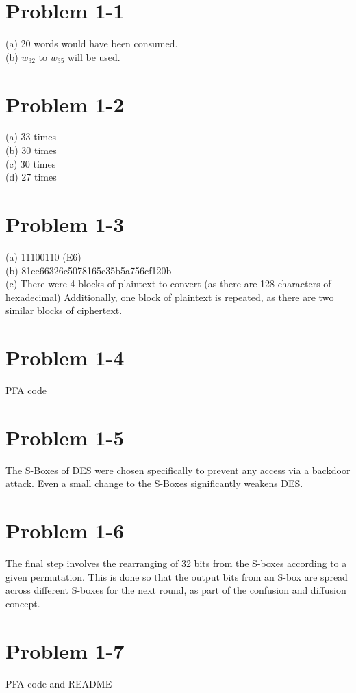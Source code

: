 \documentclass{302}
\author{Divij Singh}
\begin{document}
\section*{Problem 1-1}
(a) 20 words would have been consumed.\\
(b) $w_{32}$ to $w_{35}$ will be used.

\section*{Problem 1-2}
(a) 33 times\\
(b) 30 times\\
(c) 30 times\\
(d) 27 times

\section*{Problem 1-3}
(a) 11100110 (E6)\\
(b) 81ee66326c5078165c35b5a756cf120b\\
(c) There were 4 blocks of plaintext to convert (as there are 128 characters of hexadecimal) Additionally, one block of plaintext is repeated, as there are two similar blocks of ciphertext.

\section*{Problem 1-4}
PFA code

\section*{Problem 1-5}
The S-Boxes of DES were chosen specifically to prevent any access via a backdoor attack. Even a small change to the S-Boxes significantly weakens DES.

\section*{Problem 1-6}
The final step involves the rearranging of 32 bits from the S-boxes according to a given permutation. This is done so that the output bits from an S-box are spread across different S-boxes for the next round, as part of the confusion and diffusion concept.
 \section*{Problem 1-7}
PFA code and README
\end{document}
